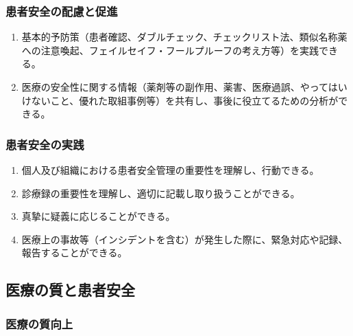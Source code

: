 \hypertarget{ux60a3ux8005ux5b89ux5168ux306eux914dux616eux3068ux4fc3ux9032}{%
\subsubsection{患者安全の配慮と促進}\label{ux60a3ux8005ux5b89ux5168ux306eux914dux616eux3068ux4fc3ux9032}}

\begin{enumerate}
\def\labelenumi{\arabic{enumi}.}
\tightlist
\item
  基本的予防策（患者確認、ダブルチェック、チェックリスト法、類似名称薬への注意喚起、フェイルセイフ・フールプルーフの考え方等）を実践できる。
\item
  医療の安全性に関する情報（薬剤等の副作用、薬害、医療過誤、やってはいけないこと、優れた取組事例等）を共有し、事後に役立てるための分析ができる。
\end{enumerate}

\hypertarget{ux60a3ux8005ux5b89ux5168ux306eux5b9fux8df5}{%
\subsubsection{患者安全の実践}\label{ux60a3ux8005ux5b89ux5168ux306eux5b9fux8df5}}

\begin{enumerate}
\def\labelenumi{\arabic{enumi}.}
\tightlist
\item
  個人及び組織における患者安全管理の重要性を理解し、行動できる。
\item
  診療録の重要性を理解し、適切に記載し取り扱うことができる。
\item
  真摯に疑義に応じることができる。
\item
  医療上の事故等（インシデントを含む）が発生した際に、緊急対応や記録、報告することができる。
\end{enumerate}

\hypertarget{ux533bux7642ux306eux8ceaux3068ux60a3ux8005ux5b89ux5168-1}{%
\subsection{医療の質と患者安全}\label{ux533bux7642ux306eux8ceaux3068ux60a3ux8005ux5b89ux5168-1}}

\hypertarget{ux533bux7642ux306eux8ceaux5411ux4e0a-1}{%
\subsubsection{医療の質向上}\label{ux533bux7642ux306eux8ceaux5411ux4e0a-1}}

